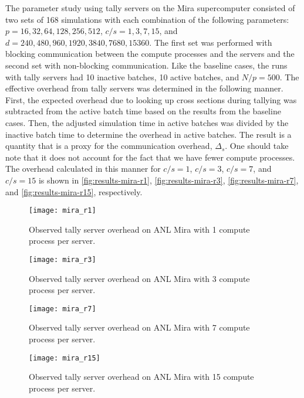 \documentclass{snamc2013}
\begin{document}
The parameter study using tally servers on the Mira supercomputer consisted of
two sets of 168 simulations with each combination of the following parameters:
$p = 16,32,64,128,256,512$, $c/s = 1,3,7,15$, and $d = 240, 480, 960, 1920,
3840, 7680, 15360$. The first set was performed with blocking communication
between the compute processes and the servers and the second set with
non-blocking communication. Like the baseline cases, the runs with tally servers
had 10 inactive batches, 10 active batches, and $N/p = 500$. The effective
overhead from tally servers was determined in the following manner. First, the
expected overhead due to looking up cross sections during tallying was
subtracted from the active batch time based on the results from the baseline
cases. Then, the adjusted simulation time in active batches was divided by the
inactive batch time to determine the overhead in active batches. The result is a
quantity that is a proxy for the communication overhead, $\Delta_s$. One should
take note that it does not account for the fact that we have fewer compute
processes.  The overhead calculated in this manner for $c/s = 1$, $c/s = 3$,
$c/s = 7$, and $c/s = 15$ is shown in \autoref{fig:results-mira-r1},
\autoref{fig:results-mira-r3}, \autoref{fig:results-mira-r7}, and
\autoref{fig:results-mira-r15}, respectively.
\begin{figure}[htb]
  \centering
  \texttt{[image: mira\_r1]}
  \caption{Observed tally server overhead on ANL Mira with 1 compute process per
    server.}
  \label{fig:results-mira-r1}
\end{figure}
\begin{figure}[htb]
  \centering
  \texttt{[image: mira\_r3]}
  \caption{Observed tally server overhead on ANL Mira with 3 compute process per
    server.}
  \label{fig:results-mira-r3}
\end{figure}
\begin{figure}[htb]
  \centering
  \texttt{[image: mira\_r7]}
  \caption{Observed tally server overhead on ANL Mira with 7 compute process per
    server.}
  \label{fig:results-mira-r7}
\end{figure}
\begin{figure}[htb]
  \centering
  \texttt{[image: mira\_r15]}
  \caption{Observed tally server overhead on ANL Mira with 15 compute process per
    server.}
  \label{fig:results-mira-r15}
\end{figure}
\end{document}
